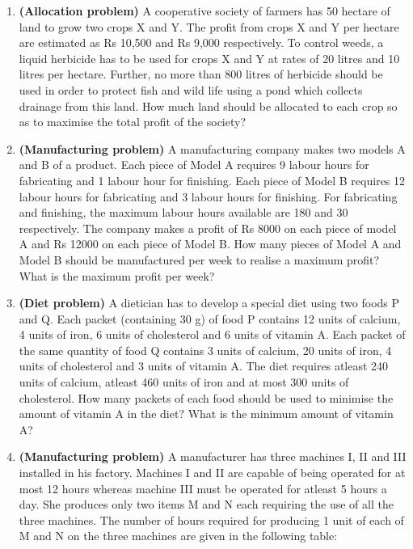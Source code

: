 \begin{enumerate}[label=\arabic*.,ref=\thesection.\theenumi]
\item \textbf{(Allocation problem)} A cooperative society of farmers has 50 hectare
of land to grow two crops X and Y. The profit from crops X and Y per hectare are
estimated as Rs 10,500 and Rs 9,000 respectively. To control weeds, a liquid herbicide
has to be used for crops X and Y at rates of 20 litres and 10 litres per hectare. Further,
no more than 800 litres of herbicide should be used in order to protect fish and wild life
using a pond which collects drainage from this land. How much land should be allocated
to each crop so as to maximise the total profit of the society?\\
\item  \textbf{(Manufacturing problem)} A manufacturing company makes two models
A and B of a product. Each piece of Model A requires 9 labour hours for fabricating
and 1 labour hour for finishing. Each piece of Model B requires 12 labour hours for
fabricating and 3 labour hours for finishing. For fabricating and finishing, the maximum
labour hours available are 180 and 30 respectively. The company makes a profit of
Rs 8000 on each piece of model A and Rs 12000 on each piece of Model B. How many
pieces of Model A and Model B should be manufactured per week to realise a maximum
profit? What is the maximum profit per week?\\
\item \textbf {(Diet problem)} A dietician has to develop a special diet using two foods
P and Q. Each packet (containing 30 g) of food P contains 12 units of calcium, 4 units
of iron, 6 units of cholesterol and 6 units of vitamin A. Each packet of the same quantity
of food Q contains 3 units of calcium, 20 units of iron, 4 units of cholesterol and 3 units
of vitamin A. The diet requires atleast 240 units of calcium, atleast 460 units of iron and
at most 300 units of cholesterol. How many packets of each food should be used to
minimise the amount of vitamin A in the diet? What is the minimum amount of vitamin A?\\
\item \textbf{(Manufacturing problem)} A manufacturer has three machines I, II
and III installed in his factory. Machines I and II are capable of being operated for
at most 12 hours whereas machine III must be operated for atleast 5 hours a day. She
produces only two items M and N each requiring the use of all the three machines.
The number of hours required for producing 1 unit of each of M and N on the three
machines are given in the following table:\\


\end{enumerate}
